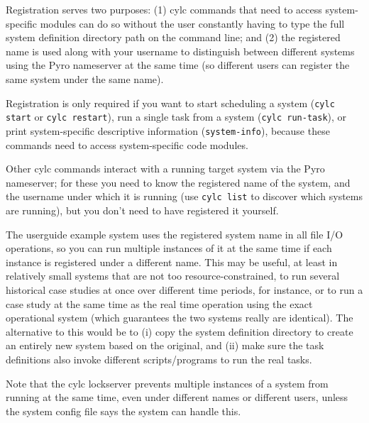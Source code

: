 Registration serves two purposes: (1) cylc commands that need to access
system-specific modules can do so without the user constantly having to
type the full system definition directory path on the command line; and
(2) the registered name is used along with your username to distinguish
between different systems using the Pyro nameserver at the same time (so
different users can register the same system under the same name). 

Registration is only required if you want to start scheduling a system
(\lstinline=cylc start= or \lstinline=cylc restart=), run a single task
from a system (\lstinline=cylc run-task=), or print system-specific
descriptive information (\lstinline=system-info=), because these
commands need to access system-specific code modules.

Other cylc commands interact with a running target system via the Pyro
nameserver; for these you need to know the registered name of the
system, and the username under which it is running (use 
\lstinline=cylc list= to discover which systems are running), but you
don't need to have registered it yourself. 

The userguide example system uses the registered system name in all file
I/O operations, so you can run multiple instances of it at the same time
if each instance is registered under a different name.  This may be
useful, at least in relatively small systems that are not too
resource-constrained, to run several historical case studies at once
over different time periods, for instance, or to run a case study at the
same time as the real time operation using the exact operational system
(which guarantees the two systems really are identical). The alternative
to this would be to (i) copy the system definition directory to create
an entirely new system based on the original, and (ii) make sure the
task definitions also invoke different scripts/programs to run the real
tasks.

Note that the cylc lockserver prevents multiple instances of a system
from running at the same time, even under different names or different
users, unless the system config file says the system can handle this.
